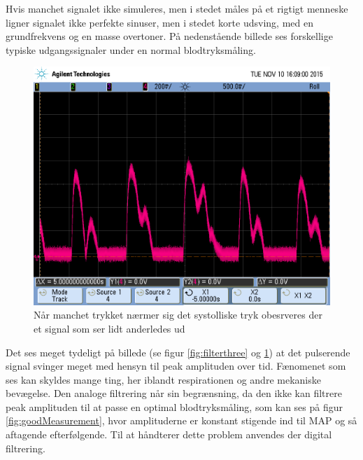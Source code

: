 Hvis manchet signalet ikke simuleres, men i stedet måles på et rigtigt menneske ligner signalet ikke perfekte sinuser, men i stedet korte udsving, med en grundfrekvens og en masse overtoner. På nedenstående billede ses forskellige typiske udgangssignaler under en normal blodtryksmåling.
\newpage

\begin{figure}[H]
	\includegraphics[width=\textwidth]{billeder/scope_2.png}
	\caption{Når manchet trykket nærmer sig det systolliske tryk obesrveres der et signal som ser lidt anderledes ud}\label{fig:filterfour}
\end{figure}

Det ses meget tydeligt på billede (se figur \ref{fig:filterthree} og \ref{fig:filterfour}) at det pulserende signal svinger meget med hensyn til peak amplituden over tid. Fænomenet som ses kan skyldes mange ting, her iblandt respirationen og andre mekaniske bevægelse. Den analoge filtrering når sin begrænsning, da den ikke kan filtrere peak amplituden til at passe en optimal blodtryksmåling, som kan ses på figur \ref{fig:goodMeasurement}, hvor amplituderne er konstant stigende ind til MAP og så aftagende efterfølgende. Til at håndterer dette problem anvendes der digital filtrering.
\newpage

